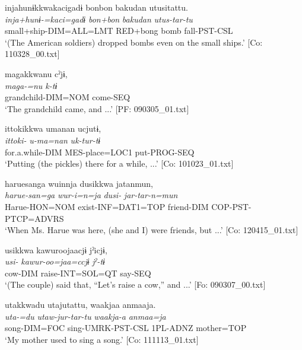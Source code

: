 \ex \label{ex:7:25c}%
\glll  injahunɨkkwakacigadɨ  {\textbar}bonbon  bakudan  utusi{\textbar}tattu.\\
\textit{inja+hunɨ-=kaci=gadɨ}  \textit{bon+bon}  \textit{bakudan}  \textit{utus-tar-tu}\\
small+ship-DIM=ALL=LMT  RED+bong  bomb  fall-PST-CSL\\
\glt ‘(The American soldiers) dropped bombs even on the small ships.’ [Co: 110328\_00.txt]

\ex \label{ex:7:25d}  %
\glll  magakkwanu  cˀjɨ,\\
\textit{maga{}-=nu  k-tɨ}\\
grandchild-DIM=NOM  come-SEQ\\
\glt ‘The grandchild came, and ...’ [PF: 090305\_01.txt]

\ex \label{ex:7:25e}  %
\glll  {\textbar}ittoki{\textbar}kkwa  umanan  ucjutɨ,\\
\textit{ittoki-}  \textit{u-ma=nan}  \textit{uk-tur-tɨ}\\
for.a.while-DIM  MES-place=LOC1  put-PROG-SEQ\\
\glt ‘Putting (the pickles) there for a while, ...’ [Co: 101023\_01.txt]

 \ex \label{ex:7:25f}
\glll  haruesanga  wuinnja  dusikkwa  jatanmun,\\
\textit{harue-san=ga}  \textit{wur-i=n=ja}  \textit{dusi-}  \textit{jar-tar-n=mun}\\
Harue-HON=NOM  exist{}-INF=DAT1=TOP  friend-DIM  COP-PST-PTCP=ADVRS\\
\glt ‘When Ms. Harue was here, (she and I) were friends, but ...’ [Co: 120415\_01.txt]

\ex \label{ex:7:25g}  %
\glll  usikkwa  kawuroojaacjɨ  jˀicjɨ,\\
\textit{usi-}  \textit{kawur-oo=jaa=ccjɨ}  \textit{jˀ-tɨ}\\
cow-DIM  raise-INT=SOL=QT  say-SEQ\\
\glt ‘(The couple) said that, “Let’s raise a cow,” and ...’ [Fo: 090307\_00.txt]

\ex \label{ex:7:25h} %
\glll  utakkwadu  utajutattu,  waakjaa  anmaaja.\\
\textit{uta-=du}  \textit{utaw-jur-tar-tu}  \textit{waakja-a}  \textit{anmaa=ja}\\
song-DIM=FOC  sing-UMRK-PST-CSL  1PL-ADNZ  mother=TOP\\
\glt ‘My mother used to sing a song.’ [Co: 111113\_01.txt]

